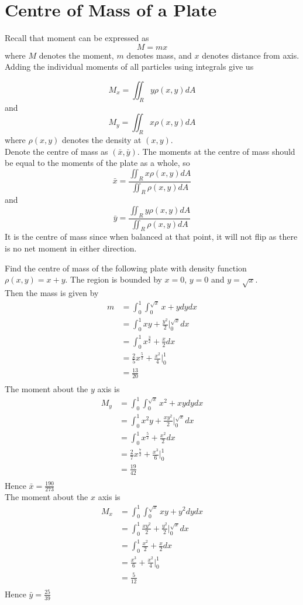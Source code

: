 \documentclass[12pt]{article}
\begin{document}
\section{Centre of Mass of a Plate}

Recall that moment can be expressed as $$M = mx$$
where $M$ denotes the moment, $m$ denotes mass, and $x$ denotes distance from axis. Adding the individual moments of all particles using integrals give us

$$M_x = \iint_R y\rho(x,y)dA$$
and
$$M_y = \iint_R x\rho(x,y)dA$$
where $\rho(x,y)$ denotes the density at $(x,y)$. \\
Denote the centre of mass as $(\bar{x},\bar{y})$. The moments at the centre of mass should be equal to the moments of the plate as a whole, so
$$\bar{x} = \frac{\iint_Rx\rho(x,y)dA}{\iint_R\rho(x,y)dA}$$
and
$$\bar{y} = \frac{\iint_Ry\rho(x,y)dA}{\iint_R\rho(x,y)dA}$$
It is the centre of mass since when balanced at that point, it will not flip as there is no net moment in either direction.

\begin{ex}
Find the centre of mass of the following plate with density function $\rho(x,y) = x+y$. The region is bounded by $x = 0$, $y = 0$ and $y = \sqrt{x}$. \\
Then the mass is given by
\begin{align*}
m &= \int_0^1 \int_0^{\sqrt{x}} x + y dydx \\
&= \int_0^1 xy + \frac{y^2}{2} \Big |_0^{\sqrt{x}} dx \\
&= \int_0^1 x^{\frac{3}{2}} + \frac{x}{2} dx \\
&= \frac{2}{5} x^{\frac{5}{2}} + \frac{x^2}{4} \Big |_{0}^1 \\
&= \frac{13}{20} \\
\end{align*}
The moment about the $y$ axis is
\begin{align*}
M_y &= \int_0^1 \int_0^{\sqrt{x}} x^2 + xy dydx \\
&= \int_0^1 x^2y + \frac{xy^2}{2} \Big |_0^{\sqrt{x}} dx \\
&= \int_0^1 x^{\frac{5}{2}} + \frac{x^2}{2} dx \\
&= \frac{2}{7} x^{\frac{7}{2}} + \frac{x^3}{6} \Big |_0^1 \\
&= \frac{19}{42} \\
\end{align*}
Hence $\bar{x} = \frac{190}{273}$ \\
The moment about the $x$ axis is
\begin{align*}
M_x &= \int_0^1 \int_0^{\sqrt{x}} xy + y^2 dydx \\
&= \int_0^1 \frac{xy^2}{2} + \frac{y^2}{2} \Big |_0^{\sqrt{x}} dx \\
&= \int_0^1 \frac{x^2}{2} + \frac{x}{2} dx \\
&= \frac{x^3}{6} + \frac{x^2}{4} \Big |_0^1 \\
&= \frac{5}{12} \\
\end{align*}
Hence $\bar{y} = \frac{25}{39}$
\end{ex}
\end{document}
